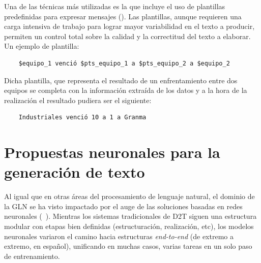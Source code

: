     Una de las t\'ecnicas m\'as utilizadas es la que incluye el uso de plantillas predefinidas para expresar mensajes (\cite{Gatt2018SurveyOT}). Las 
plantillas, aunque requieren una carga intensiva de trabajo para lograr mayor variabilidad en el texto a producir, permiten un control total sobre 
la calidad y la correctitud del texto a elaborar. Un ejemplo de plantilla:

\begin{verbatim}
    $equipo_1 venció $pts_equipo_1 a $pts_equipo_2 a $equipo_2
\end{verbatim}

    Dicha plantilla, que representa el resultado de un enfrentamiento entre dos equipos se completa con la información extraída de los datos y a la hora de 
la realización el resultado pudiera ser el siguiente:

\begin{verbatim}
    Industriales venció 10 a 1 a Granma
\end{verbatim}

\section{Propuestas neuronales para la generación de texto}
    Al igual que en otras áreas del procesamiento de lenguaje natural, el dominio de la GLN se ha visto 
impactado por el auge de las soluciones basadas en redes neuronales (~\cite{Gatt2018SurveyOT,sharma2022innovations}). 
Mientras los sistemas tradicionales de D2T siguen una estructura modular con etapas bien definidas (estructuración, realización, etc), 
los modelos neuronales variaron el camino hacia estructuras \emph{end-to-end} (de extremo a extremo, en español), unificando 
en muchas casos, varias tareas en un solo paso de entrenamiento.

